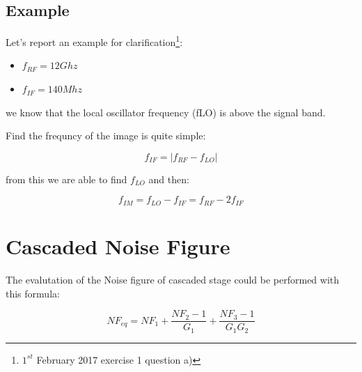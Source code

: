 \subsection*{Example} %
\label{sub:example}

Let's report an example for clarification\footnote{$1^{st}$ February 2017 exercise 1 question a)}:
\begin{itemize}
	\item $f_{RF}= 12 Ghz$ 
	\item $f_{IF}= 140 Mhz$ 
\end{itemize}

we know that the local oscillator frequency (fLO) is above the signal band.

Find the frequncy of the image is quite simple:


\begin{equation}
	f_{IF}=|f_{RF}-f_{LO}|
\end{equation}

from this we are able to find $f_{LO}$ and then:

\begin{equation}
		f_{IM}=f_{LO}-f_{IF}= f_{RF}-2f_{IF}
\end{equation}

\section{Cascaded Noise Figure} %
\label{sec:cascaded_noise_figure}

The evalutation of the Noise figure of cascaded stage could be performed with this formula:

\begin{equation}
	NF_{eq}= NF_1 + \frac{NF_2-1}{G_1} + \frac{NF_3-1}{G_1G_2} 
\end{equation}






